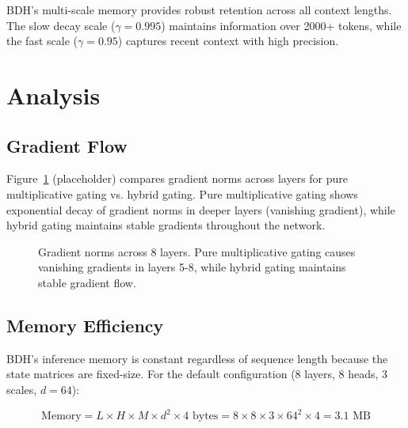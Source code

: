 \documentclass{article}
\begin{document}
BDH's multi-scale memory provides robust retention across all context lengths. The slow decay scale ($\gamma=0.995$) maintains information over 2000+ tokens, while the fast scale ($\gamma=0.95$) captures recent context with high precision.

\section{Analysis}

\subsection{Gradient Flow}

Figure~\ref{fig:gradients} (placeholder) compares gradient norms across layers for pure multiplicative gating vs. hybrid gating. Pure multiplicative gating shows exponential decay of gradient norms in deeper layers (vanishing gradient), while hybrid gating maintains stable gradients throughout the network.

\begin{figure}[t]
    \centering
    \caption{Gradient norms across 8 layers. Pure multiplicative gating causes vanishing gradients in layers 5-8, while hybrid gating maintains stable gradient flow.}
    \label{fig:gradients}
\end{figure}

\subsection{Memory Efficiency}

BDH's inference memory is constant regardless of sequence length because the state matrices are fixed-size. For the default configuration (8 layers, 8 heads, 3 scales, $d=64$):

\begin{equation}
\text{Memory} = L \times H \times M \times d^2 \times 4\text{ bytes} = 8 \times 8 \times 3 \times 64^2 \times 4 = 3.1\text{ MB}
\end{equation}
\end{document}
